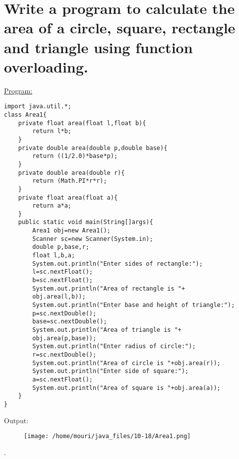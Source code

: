 \documentclass[a4paper,11pt]{article}
\begin{document}
\section{Write a program to calculate the area of a circle, square, rectangle and triangle using function overloading.}
\underline{Program:}
\begin{lstlisting}[showstringspaces=false]
import java.util.*;
class Area1{
	private float area(float l,float b){
		return l*b;
	}
	private double area(double p,double base){
		return ((1/2.0)*base*p);
	}	
	private double area(double r){
		return (Math.PI*r*r);
	}	
	private float area(float a){
		return a*a;
	}
	public static void main(String[]args){
		Area1 obj=new Area1();
		Scanner sc=new Scanner(System.in);
		double p,base,r;
		float l,b,a;
		System.out.println("Enter sides of rectangle:");
		l=sc.nextFloat();
		b=sc.nextFloat();
		System.out.println("Area of rectangle is "+
		obj.area(l,b));
		System.out.println("Enter base and height of triangle:");
		p=sc.nextDouble();
		base=sc.nextDouble();
		System.out.println("Area of triangle is "+
		obj.area(p,base));
		System.out.println("Enter radius of circle:");
		r=sc.nextDouble();
		System.out.println("Area of circle is "+obj.area(r));
		System.out.println("Enter side of square:");
		a=sc.nextFloat();
		System.out.println("Area of square is "+obj.area(a));
	}
}
\end{lstlisting}
Output:
\begin{figure}[H]
\centering
\texttt{[image: /home/mouri/java\_files/10-18/Area1.png]}
\end{figure}
.
\end{document}
